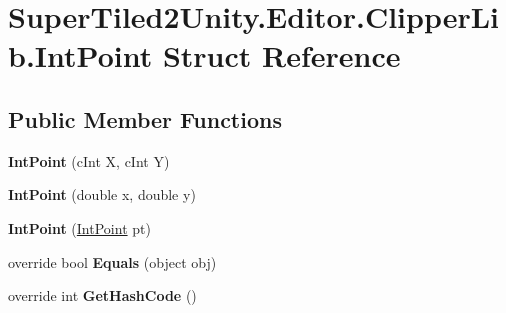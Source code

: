 \hypertarget{struct_super_tiled2_unity_1_1_editor_1_1_clipper_lib_1_1_int_point}{}\section{Super\+Tiled2\+Unity.\+Editor.\+Clipper\+Lib.\+Int\+Point Struct Reference}
\label{struct_super_tiled2_unity_1_1_editor_1_1_clipper_lib_1_1_int_point}
\subsection*{Public Member Functions}
\begin{DoxyCompactItemize}
\item 
\mbox{\label{struct_super_tiled2_unity_1_1_editor_1_1_clipper_lib_1_1_int_point_ac103bc2040137e7da05c0015f015f946}} 
{\bfseries Int\+Point} (c\+Int X, c\+Int Y)
\item 
\mbox{\label{struct_super_tiled2_unity_1_1_editor_1_1_clipper_lib_1_1_int_point_a585986c9fc2527234ac3bb43660959e3}} 
{\bfseries Int\+Point} (double x, double y)
\item 
\mbox{\label{struct_super_tiled2_unity_1_1_editor_1_1_clipper_lib_1_1_int_point_a36f128e26bc82c8c0549170d8efdc314}} 
{\bfseries Int\+Point} (\mbox{\hyperlink{struct_super_tiled2_unity_1_1_editor_1_1_clipper_lib_1_1_int_point}{Int\+Point}} pt)
\item 
\mbox{\label{struct_super_tiled2_unity_1_1_editor_1_1_clipper_lib_1_1_int_point_a3125da18933317d318fe4c5a1dc5311b}} 
override bool {\bfseries Equals} (object obj)
\item 
\mbox{\label{struct_super_tiled2_unity_1_1_editor_1_1_clipper_lib_1_1_int_point_af5bd11736054970585b1bc75e6dbfdd3}} 
override int {\bfseries Get\+Hash\+Code} ()
\end{DoxyCompactItemize}
